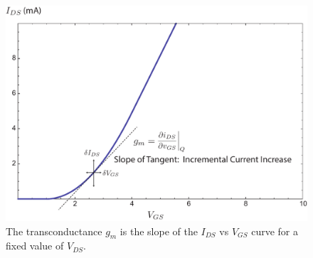 \begin{figure}[t]
\centering
\includegraphics[width=.85\columnwidth]{id_vgs_slope}
\caption{The transconductance $g_m$ is the slope of the $I_{DS}$ vs $V_{GS}$ curve for a fixed value of $V_{DS}$.}
\label{fig:id_vgs_slope}
\end{figure}
